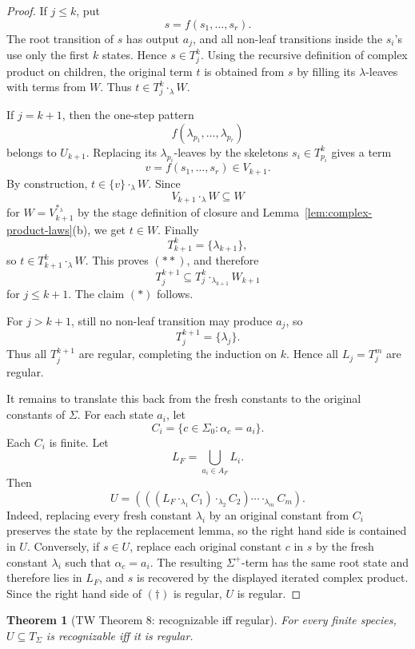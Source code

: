 \documentclass[11pt]{article}
\newtheorem{theorem}{Theorem}
\theoremstyle{definition}
\newcommand{\SigmaSym}{\Sigma}
\newcommand{\Term}[1]{T_{#1}}
\begin{document}
\begin{proof}
If \(j\le k\), put
\[
  s=f(s_1,\ldots,s_r).
\]
The root transition of \(s\) has output \(a_j\), and all non-leaf transitions
inside the \(s_i\)'s use only the first \(k\) states.  Hence \(s\in T_j^k\).
Using the recursive definition of complex product on children, the original
term \(t\) is obtained from \(s\) by filling its \(\lambda\)-leaves with terms
from \(W\).  Thus \(t\in T_j^k\cdot_\lambda W\).

If \(j=k+1\), then the one-step pattern
\[
  f(\lambda_{p_1},\ldots,\lambda_{p_r})
\]
belongs to \(U_{k+1}\).  Replacing its \(\lambda_{p_i}\)-leaves by the
skeletons \(s_i\in T_{p_i}^k\) gives a term
\[
  v=f(s_1,\ldots,s_r)\in V_{k+1}.
\]
By construction, \(t\in\{v\}\cdot_\lambda W\).  Since
\[
  V_{k+1}\cdot_\lambda W\subseteq W
\]
for \(W=V_{k+1}^{*_\lambda}\) by the stage definition of closure and
Lemma~\ref{lem:complex-product-laws}(b), we get \(t\in W\).  Finally
\[
  T_{k+1}^k=\{\lambda_{k+1}\},
\]
so \(t\in T_{k+1}^k\cdot_\lambda W\).  This proves \((**)\), and therefore
\[
  T_j^{k+1}\subseteq T_j^k\cdot_{\lambda_{k+1}}W_{k+1}
\]
for \(j\le k+1\).  The claim \((*)\) follows.

For \(j>k+1\), still no non-leaf transition may produce \(a_j\), so
\[
  T_j^{k+1}=\{\lambda_j\}.
\]
Thus all \(T_j^{k+1}\) are regular, completing the induction on \(k\).  Hence
all \(L_j=T_j^m\) are regular.

It remains to translate this back from the fresh constants to the original
constants of \(\SigmaSym\).  For each state \(a_i\), let
\[
  C_i=\{c\in\SigmaSym_0:\alpha_c=a_i\}.
\]
Each \(C_i\) is finite.  Let
\[
  L_F=\bigcup_{a_i\in A_F}L_i.
\]
Then
\[
  U
  =
  (((L_F\cdot_{\lambda_1}C_1)\cdot_{\lambda_2}C_2)\cdots
    \cdot_{\lambda_m}C_m).       \tag{\(\dagger\)}
\]
Indeed, replacing every fresh constant \(\lambda_i\) by an original constant
from \(C_i\) preserves the state by the replacement lemma, so the right hand
side is contained in \(U\).  Conversely, if \(s\in U\), replace each original
constant \(c\) in \(s\) by the fresh constant \(\lambda_i\) such that
\(\alpha_c=a_i\).  The resulting \(\Sigma^+\)-term has the same root state and
therefore lies in \(L_F\), and \(s\) is recovered by the displayed iterated
complex product.  Since the right hand side of \((\dagger)\) is regular,
\(U\) is regular.
\end{proof}

\begin{theorem}[TW Theorem 8: recognizable iff regular]\label{thm:tw-recognizable-regular}
For every finite species, \(U\subseteq\Term{\SigmaSym}\) is recognizable iff it
is regular.
\end{theorem}
\end{document}
